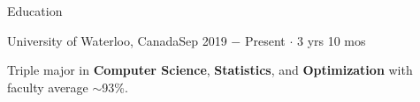 \documentclass{resume}
\begin{document}


\begin{rSection}{Education}

    \begin{rSubsection}{University of Waterloo, Canada}{Sep 2019 \(-\) Present \(\cdot\) 3 yrs 10 mos}{}{}
        \item Triple major in \textbf{Computer Science}, \textbf{Statistics}, and \textbf{Optimization} with faculty average \(\sim\)93\%.
    \end{rSubsection}

\end{rSection}
\end{document}
